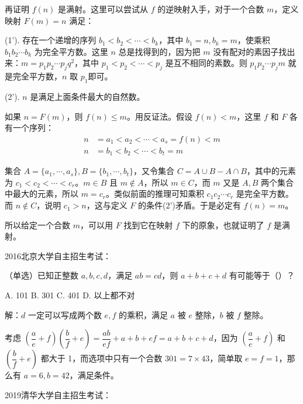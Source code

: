 再证明 $ f(n) $ 是满射。这里可以尝试从 $ f $ 的逆映射入手，对于一个合数 $ m $，定义映射 $ F(m)=n $ 满足：

(1'). 存在一个递增的序列 $ b_1 < b_2 < \cdots < b_k $，其中 $ b_1 = n, b_k = m $，使乘积 $ b_1b_2\cdots b_k $ 为完全平方数。这里 $ n $ 总是找得到的，因为把 $ m $ 没有配对的素因子找出来：$ m=p_1p_2\cdots p_j q^2 $，其中 $ p_1<p_2<\cdots<p_j $ 是互不相同的素数。则 $ p_1p_2\cdots p_jm $ 就是完全平方数，$ n $ 取 $ p_1 $即可。

(2'). $ n $ 是满足上面条件最大的自然数。

如果 $ n = F(m) $，则 $ f(n) \le m $。用反证法。假设 $ f(n) < m $，这里 $ f $ 和 $ F $ 各有一个序列：
\begin{align*}
n&=a_1<a_2<\cdots < a_s = f(n) < m \\ 
n&=b_1<b_2<\cdots < b_t = m
\end{align*}

集合 $ A = \{a_1,\cdots,a_s\}, B = \{b_1,\cdots,b_t\}$，又令集合 $ C = A\cup B - A\cap B $，其中的元素为 $ c_1 < c_2 < \cdots < c_r $。$ m\in B $ 且 $ m\notin A $，所以 $ m \in C $，而 $ m $ 又是 $ A,B $ 两个集合中最大的元素，所以 $ m = c_r$。类似前面的推理可知乘积 $ c_1c_2\cdots c_r $ 是完全平方数。而 $ n \notin C $，说明 $ c_1 > n $，这与定义 $ F $ 的条件(2')矛盾。于是必定有 $ f(n) = m $。

所以给定一个合数 $ m $，可以用 $ F $ 找到它在映射 $ f $ 下的原象，也就证明了 $ f $ 是满射。

\newpage

2016北京大学自主招生考试：

（单选）已知正整数 $ a,b,c,d $，满足 $ ab=cd $，则 $ a+b+c+d $ 有可能等于（）？

A. 101 \hspace{4em}  B. 301 \hspace{4em}  C. 401 \hspace{4em}  D. 以上都不对

解：$ d $ 一定可以写成两个数 $ e,f $ 的乘积，满足 $ a $ 被 $ e $ 整除，$ b $ 被 $ f $ 整除。

考虑 $ (\dfrac{a}{e}+f)(\dfrac{b}{f}+e) = \dfrac{ab}{ef} + a + b + ef = a+b+c+d $，因为 $ (\dfrac{a}{e}+f) $ 和 $ (\dfrac{b}{f}+e) $ 都大于 1，而选项中只有一个合数 $ 301=7\times 43 $，简单取 $ e=f=1 $，那么有 $ a=6, b=42 $，满足条件。

\newpage

2019清华大学自主招生考试：

